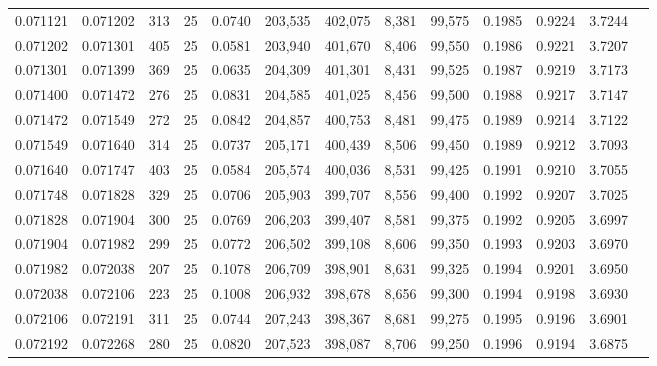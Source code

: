 \begin{tabular}{rrrrrrrrrrrrr}
0.071121 & 0.071202 &   313 &  25 &                                     0.0740 & 203,535 & 402,075 &   8,381 &  99,575 & 0.1985 & 0.9224 & 3.7244 \\
0.071202 & 0.071301 &   405 &  25 &                                     0.0581 & 203,940 & 401,670 &   8,406 &  99,550 & 0.1986 & 0.9221 & 3.7207 \\
0.071301 & 0.071399 &   369 &  25 &                                     0.0635 & 204,309 & 401,301 &   8,431 &  99,525 & 0.1987 & 0.9219 & 3.7173 \\
0.071400 & 0.071472 &   276 &  25 &                                     0.0831 & 204,585 & 401,025 &   8,456 &  99,500 & 0.1988 & 0.9217 & 3.7147 \\
0.071472 & 0.071549 &   272 &  25 &                                     0.0842 & 204,857 & 400,753 &   8,481 &  99,475 & 0.1989 & 0.9214 & 3.7122 \\
0.071549 & 0.071640 &   314 &  25 &                                     0.0737 & 205,171 & 400,439 &   8,506 &  99,450 & 0.1989 & 0.9212 & 3.7093 \\
0.071640 & 0.071747 &   403 &  25 &                                     0.0584 & 205,574 & 400,036 &   8,531 &  99,425 & 0.1991 & 0.9210 & 3.7055 \\
0.071748 & 0.071828 &   329 &  25 &                                     0.0706 & 205,903 & 399,707 &   8,556 &  99,400 & 0.1992 & 0.9207 & 3.7025 \\
0.071828 & 0.071904 &   300 &  25 &                                     0.0769 & 206,203 & 399,407 &   8,581 &  99,375 & 0.1992 & 0.9205 & 3.6997 \\
0.071904 & 0.071982 &   299 &  25 &                                     0.0772 & 206,502 & 399,108 &   8,606 &  99,350 & 0.1993 & 0.9203 & 3.6970 \\
0.071982 & 0.072038 &   207 &  25 &                                     0.1078 & 206,709 & 398,901 &   8,631 &  99,325 & 0.1994 & 0.9201 & 3.6950 \\
0.072038 & 0.072106 &   223 &  25 &                                     0.1008 & 206,932 & 398,678 &   8,656 &  99,300 & 0.1994 & 0.9198 & 3.6930 \\
0.072106 & 0.072191 &   311 &  25 &                                     0.0744 & 207,243 & 398,367 &   8,681 &  99,275 & 0.1995 & 0.9196 & 3.6901 \\
0.072192 & 0.072268 &   280 &  25 &                                     0.0820 & 207,523 & 398,087 &   8,706 &  99,250 & 0.1996 & 0.9194 & 3.6875 \\

\end{tabular}
